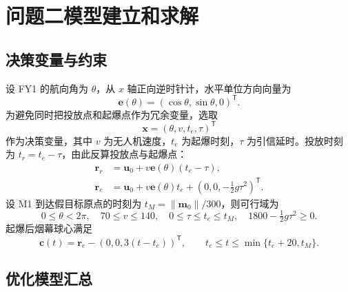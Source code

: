 \section{问题二模型建立和求解}

\subsection{决策变量与约束}

设 FY1 的航向角为 $\theta$，从 $x$ 轴正向逆时针计，水平单位方向向量为
\begin{equation}
    \bm e(\theta)=(\cos\theta,\sin\theta,0)^{\mathsf T}.
\end{equation}
为避免同时把投放点和起爆点作为冗余变量，选取
\begin{equation}
    \bm x=(\theta,v,t_e,\tau)^{\mathsf T}
    \label{eq:q2-decision}
\end{equation}
作为决策变量，其中 $v$ 为无人机速度，$t_e$ 为起爆时刻，$\tau$ 为引信延时。投放时刻为 $t_r=t_e-\tau$，由此反算投放点与起爆点：
\begin{align}
    \bm r_r&=\bm u_0+v\bm e(\theta)(t_e-\tau), \\
    \bm r_e&=\bm u_0+v\bm e(\theta)t_e
    +(0,0,-\tfrac12g\tau^2)^{\mathsf T}.
    \label{eq:q2-points}
\end{align}
设 M1 到达假目标原点的时刻为 $t_M=\lVert\bm m_0\rVert/300$，则可行域为
\begin{equation}
    0\le\theta<2\pi,\quad 70\le v\le140,\quad
    0\le\tau\le t_e\le t_M,\quad
    1800-\tfrac12g\tau^2\ge0.
    \label{eq:q2-constraints}
\end{equation}
起爆后烟幕球心满足
\begin{equation}
    \bm c(t)=\bm r_e-(0,0,3(t-t_e))^{\mathsf T},\qquad
    t_e\le t\le\min\{t_e+20,t_M\}.
\end{equation}

\subsection{优化模型汇总}

